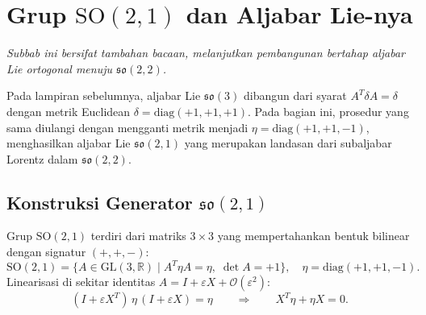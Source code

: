 \section{Grup $\mathrm{SO}(2,1)$ dan Aljabar Lie-nya}
\label{app:SO21-algebra}

\noindent\textit{Subbab ini bersifat tambahan bacaan, melanjutkan pembangunan bertahap aljabar Lie ortogonal menuju $\mathfrak{so}(2,2)$.}

Pada lampiran sebelumnya, aljabar Lie $\mathfrak{so}(3)$ dibangun dari syarat $A^T\delta A = \delta$ dengan metrik Euclidean $\delta = \mathrm{diag}(+1,+1,+1)$. Pada bagian ini, prosedur yang sama diulangi dengan mengganti metrik menjadi $\eta = \mathrm{diag}(+1,+1,-1)$, menghasilkan aljabar Lie $\mathfrak{so}(2,1)$ yang merupakan landasan dari subaljabar Lorentz dalam $\mathfrak{so}(2,2)$.

\subsection{Konstruksi Generator $\mathfrak{so}(2,1)$}

Grup $\mathrm{SO}(2,1)$ terdiri dari matriks $3 \times 3$ yang mempertahankan bentuk bilinear dengan signatur $(+,+,-)$:
\begin{equation}\label{a2-eq:so21-def}
    \mathrm{SO}(2,1) = \{A \in \mathrm{GL}(3,\mathbb{R}) \mid A^T\eta A = \eta,\;\det A = +1\},
    \quad \eta = \mathrm{diag}(+1,+1,-1).
\end{equation}
Linearisasi di sekitar identitas $A = I + \varepsilon X + \mathcal{O}(\varepsilon^2)$:
\begin{equation}
    (I + \varepsilon X^T)\,\eta\,(I + \varepsilon X) = \eta
    \qquad\Longrightarrow\qquad
    X^T\eta + \eta X = 0.
\end{equation}

